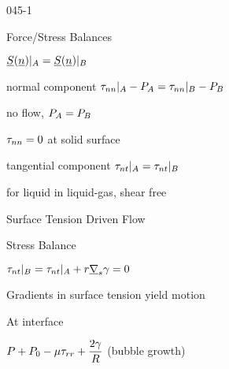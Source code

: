\begin{mitframe}{045-1}
\begin{listone}
\begin{listtwo}
\begin{listthree}
\begin{listfour}
\begin{listfive}
                                            \end{listfive}	
                               \end{listfour}
                    \end{listthree}
							\item Force/Stress Balances
					\begin{listthree}
        					\item $\stressvec(\normvec)|_{\helmholtz}=\stressvec(\normvec)|_{\exergy}$
            				\item normal component $\torque_{nn}|_{\helmholtz}-\p_{\helmholtz}=\torque_{nn}|_{\exergy}-\p_{\exergy}$ 								\begin{listfour}
            \item no flow, $\p_{\helmholtz}=\p_{\exergy}$
            \item $\torque_{nn}=0$ at solid surface
            				\end{listfour}
       		\item tangential component $\torque_{nt}|_{\helmholtz}=\torque_{nt}|_{\exergy}$
       						\begin{listfour}
                				\item for liquid in liquid-gas, shear free
                			\end{listfour}
        	\end{listthree}
\item Surface Tension Driven Flow
			\begin{listthree}
        		\item Stress Balance
        			\begin{listfour}
                		\item $\torque_{nt}|_{\exergy}=\torque_{nt}|_{\helmholtz}+\pos\gradop_{s}\gamma=0$
                    	      \begin{listfive}
                                		\item Gradients in surface tension yield motion
                                \end{listfive}
                                \end{listfour}
                            \end{listthree}
                \item At interface
                				\begin{listfour}
                                		\item $\p+\p_{0}-\chempot\torque_{\pos\pos}+\dfrac{2\gamma}{\gasconst}$ (bubble growth)

\end{listfour}
\end{listtwo}
\end{listone}
\end{mitframe}
